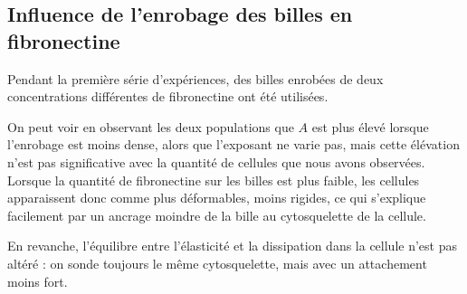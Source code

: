 \subsection{Influence de l'enrobage des billes en fibronectine}

Pendant la première série d'expériences, des billes enrobées de deux concentrations différentes de fibronectine ont été utilisées. 

On peut voir en observant les deux populations que $A$ est plus élevé lorsque l'enrobage est moins dense, alors que l'exposant ne varie pas, mais cette élévation n'est pas significative avec la quantité de cellules que nous avons observées.
Lorsque la quantité de fibronectine sur les billes est plus faible, les cellules apparaissent donc comme plus déformables, moins rigides, ce qui s'explique facilement par un ancrage moindre de la bille au cytosquelette de la cellule.  

En revanche, l'équilibre entre l'élasticité et la dissipation dans la cellule n'est pas altéré : on sonde toujours le même cytosquelette, mais avec un attachement moins fort. 

